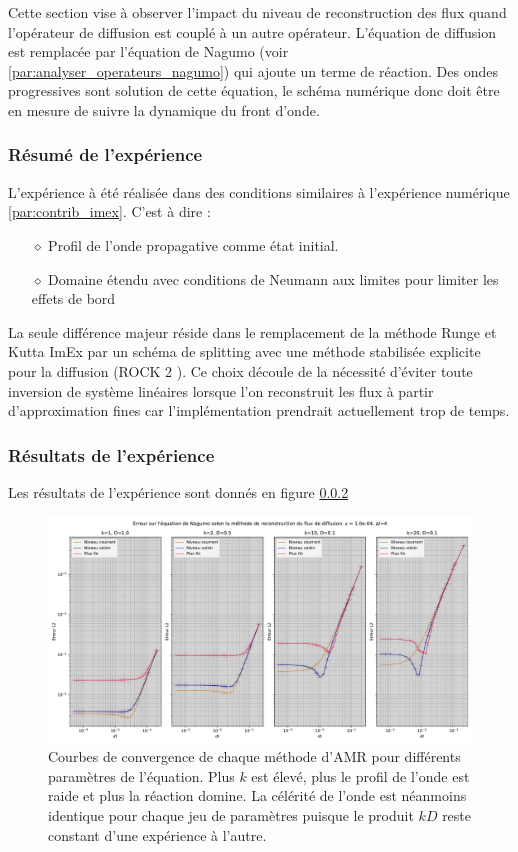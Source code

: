 Cette section vise à observer l'impact du niveau de reconstruction des flux quand l'opérateur de diffusion est couplé à un autre opérateur. 
L'équation de diffusion est remplacée par l'équation de Nagumo (voir \ref{par:analyser_operateurs_nagumo}) qui ajoute un terme de réaction. 
Des ondes progressives sont solution de cette équation, le schéma numérique donc doit être en mesure de suivre la dynamique du front d'onde.

\subsubsection{Résumé de l'expérience}
L'expérience à été réalisée dans des conditions similaires à l'expérience numérique \ref{par:contrib_imex}. 
C'est à dire :
\begin{itemize}
    \item[$\diamond$] Profil de l'onde propagative comme état initial.
    \item[$\diamond$] Domaine étendu avec conditions de Neumann aux limites pour limiter les effets de bord
\end{itemize}
La seule différence majeur réside dans le remplacement de la méthode Runge et Kutta ImEx par un schéma de splitting avec une méthode stabilisée explicite pour la diffusion (ROCK 2 \cite{AbdulleMedovikov2001}).
Ce choix découle de la nécessité d'éviter toute inversion de système linéaires lorsque l'on reconstruit les flux à partir d'approximation 
fines car l’implémentation prendrait actuellement trop de temps.


\subsubsection{Résultats de l'expérience}
Les résultats de l'expérience sont donnés en figure \ref{}
\begin{figure}[h!]
    \centering
    \includegraphics[width=\textwidth]{media/4_travail/3/flux_reconstruction_method_nagumo.pdf}
    \caption{Courbes de convergence de chaque méthode d'AMR pour différents paramètres de l'équation. Plus $k$ est élevé, plus le profil de l'onde est raide et plus la réaction domine. La célérité de l'onde est néanmoins identique pour chaque jeu de paramètres puisque le produit $kD$ reste constant d'une expérience à l'autre.}
    \label{fig:flux_reconstruction_nagumo}
\end{figure}